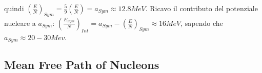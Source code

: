 \documentclass[main.tex]{subfiles}
\begin{document}
quindi $(\frac{E}{N})_{Sym}=\frac{5}{9}(\frac{E}{N})=a_{Sym}\approx 12.8 MeV$. Ricavo il contributo del potenziale nucleare a $a_{Sym}$:
$(\frac{E_{Sym}}{N})_{Int}=a_{Sym}-(\frac{E}{N})_{Sym}\approx16 MeV$, sapendo che $a_{Sym}\approx20-30 Mev$.

\subsection{Mean Free Path of Nucleons}

\begin{comment}
Mean Free Path of Nucleons
A fundamental characteristic of any many-body system is the mean free path for collisions between constituent particles. A wide variety of evidence testifies to the fact that, in the nucleus, this mean free path is large compared to the distance between the nucleons and even, under many circumstances, is larger than the dimensions of the nucleus.
A very direct way to explore the nuclear opacity is provided by scattering experiments involving incident neutrons and protons. 
 For a system with a mean free path small com- pared to the radius, the total cross section would vary monotonically with energy, decreasing slowly over the eneirgy region considered, toward the limiting value 2nR ’. (For a discussion of general scattering theory as applied to nuclei, and for the estimate of cross sections for totally absorbing systems, see, for example, Blatt and Weisskopf, 1952, Chapter 8.) The pronounced variations in the observed cross sections must be attributed to the interference between the incident and transmitted waves, and thus establish the fact that the mean free path is at least comparable with the nuclear radius. (We later return to the more quantitative analysis of such scattering experiments (Sec. 2-4c); see also the discussion in connection with Fig. 2-3.)
The relatively long mean free path of the nucleons implies that the inter- actions primarily contribute a smoothly varying average potential in which the particles move independently. As a first approximation of heavy nuclei, we may neglect surface effects, and the resulting Fermi gas model provides a useful starting point for the discussion of many of the bulk properties of nuclei.
\end{comment}
\end{document}
